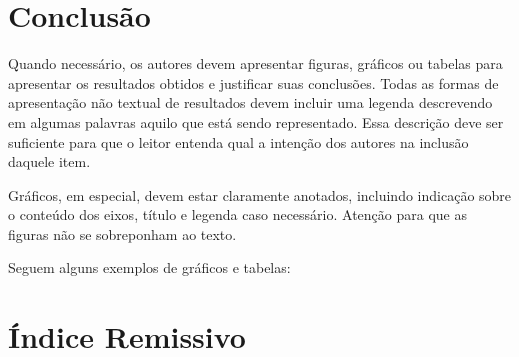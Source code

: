 \documentclass[12pt,a4paper]{article}
\begin{document}
\section{Conclusão}

Quando necessário, os autores devem apresentar figuras, gráficos ou tabelas para apresentar os resultados obtidos e justificar suas conclusões. Todas as formas de apresentação não textual de resultados devem incluir uma legenda descrevendo em algumas palavras aquilo que está sendo representado. Essa descrição deve ser suficiente para que o leitor entenda qual a intenção dos autores na inclusão daquele item.

Gráficos, em especial, devem estar claramente anotados, incluindo indicação sobre o conteúdo dos eixos, título e legenda caso necessário. Atenção para que as figuras não se sobreponham ao texto.

Seguem alguns exemplos de gráficos e tabelas:

\section*{Índice Remissivo}
\end{document}
